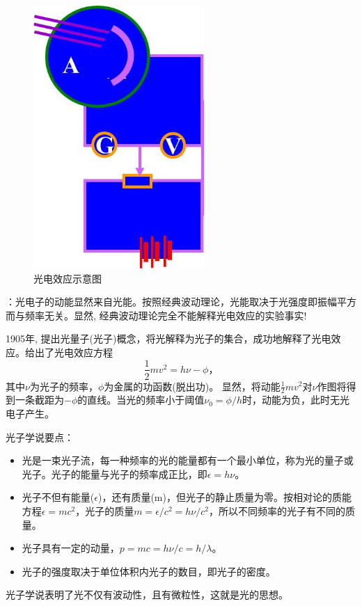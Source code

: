 \begin{figure}[!ht]
\centering
\includegraphics[height=10cm]{pic/photon_electron.jpg}
\caption{光电效应示意图}
\end{figure}

：光电子的动能显然来自光能。按照经典波动理论，光能取决于光强度即振幅平方而与频率无关。显然, 经典波动理论完全不能解释光电效应的实验事实!

1905年, \einstein 提出光量子(光子)概念，将光解释为光子的集合，成功地解释了光电效应。给出了光电效应方程$$\frac{1}{2}mv^2=h\nu - \phi，$$ 其中$\nu$为光子的频率，$\phi$为金属的功函数(脱出功)。 
显然，将动能$\frac{1}{2}mv^2$对$\nu$作图将得到一条截距为$-\phi$的直线。当光的频率小于阈值$\nu_0 = \phi / h$时，动能为负，此时无光电子产生。

\einstein 光子学说要点：
\begin{itemize}
\item 光是一束光子流，每一种频率的光的能量都有一个最小单位，称为光的量子或光子。光子的能量与光子的频率成正比，即$\epsilon = h\nu$。
\item 光子不但有能量($\epsilon$)，还有质量(m)，但光子的静止质量为零。按相对论的质能方程$ \epsilon = mc^2$，光子的质量$ m = \epsilon/c^2 = h\nu/c^2 $，所以不同频率的光子有不同的质量。
\item 光子具有一定的动量，$ p = mc = h\nu/c = h / \lambda $。
\item 光子的强度取决于单位体积内光子的数目，即光子的密度。		
\end{itemize}
光子学说表明了光不仅有波动性，且有微粒性，这就是光的思想。


